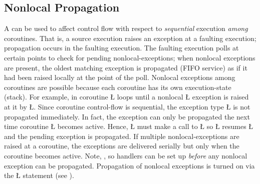 \documentclass[openright,twoside]{report}
\begin{document}
\subsection{Nonlocal Propagation}

A  can be used to affect control flow with respect to \emph{sequential} execution \emph{among} coroutines.
That is, a source execution raises an exception at a faulting execution;
propagation occurs in the faulting execution.
The faulting execution polls at certain points to check for pending nonlocal-exceptions;
when nonlocal exceptions are present, the oldest matching exception is propagated (FIFO service) as if it had been raised locally at the point of the poll.
Nonlocal exceptions among coroutines are possible because each coroutine has its own execution-state (stack).
For example, in  coroutine \LGinlinetrue\LGbegin\lgrinde\L{}\endlgrinde\LGend{} loops until a nonlocal \LGinlinetrue\LGbegin\lgrinde\L{}\endlgrinde\LGend{} exception is raised at it by \LGinlinetrue\LGbegin\lgrinde\L{}\endlgrinde\LGend{}.
Since coroutine control-flow is sequential, the exception type \LGinlinetrue\LGbegin\lgrinde\L{}\endlgrinde\LGend{} is not propagated immediately.
In fact, the exception can only be propagated the next time coroutine \LGinlinetrue\LGbegin\lgrinde\L{}\endlgrinde\LGend{} becomes active.
Hence, \LGinlinetrue\LGbegin\lgrinde\L{}\endlgrinde\LGend{} must make a call to \LGinlinetrue\LGbegin\lgrinde\L{}\endlgrinde\LGend{} so \LGinlinetrue\LGbegin\lgrinde\L{}\endlgrinde\LGend{} resumes \LGinlinetrue\LGbegin\lgrinde\L{}\endlgrinde\LGend{} and the pending exception is propagated.
If multiple nonlocal-exceptions are raised at a coroutine, the exceptions are delivered serially but only when the coroutine becomes active.
Note, , so handlers can be set up \emph{before} any nonlocal exception can be propagated.
Propagation of nonlocal exceptions is turned on via the \LGinlinetrue\LGbegin\lgrinde\L{}\endlgrinde\LGend{} statement (see ).
\end{document}
